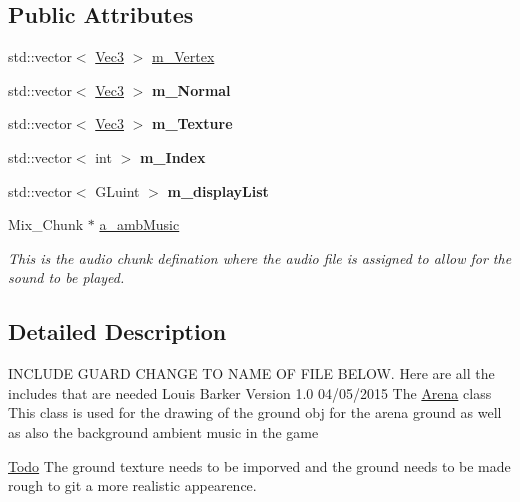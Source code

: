 \subsection*{Public Attributes}
\begin{DoxyCompactItemize}
\item 
std::vector$<$ \hyperlink{classVec3}{Vec3} $>$ \hyperlink{classArena_ac59e6d56bc44072d9d7dba67e564f391}{m\_\-Vertex}
\item 
\hypertarget{classArena_a3e8110033d9a5dfbe494f805600d7791}{
std::vector$<$ \hyperlink{classVec3}{Vec3} $>$ {\bfseries m\_\-Normal}}
\label{classArena_a3e8110033d9a5dfbe494f805600d7791}

\item 
\hypertarget{classArena_a5e3195849d8d9736489971685b6cb679}{
std::vector$<$ \hyperlink{classVec3}{Vec3} $>$ {\bfseries m\_\-Texture}}
\label{classArena_a5e3195849d8d9736489971685b6cb679}

\item 
\hypertarget{classArena_a3198a681ee8b1b01e40fee66f6042b20}{
std::vector$<$ int $>$ {\bfseries m\_\-Index}}
\label{classArena_a3198a681ee8b1b01e40fee66f6042b20}

\item 
\hypertarget{classArena_a930938ac5f4e5c615c740fa529d6c356}{
std::vector$<$ GLuint $>$ {\bfseries m\_\-displayList}}
\label{classArena_a930938ac5f4e5c615c740fa529d6c356}

\item 
\hypertarget{classArena_a5ada0c01bac277be035b19d317927708}{
Mix\_\-Chunk $\ast$ \hyperlink{classArena_a5ada0c01bac277be035b19d317927708}{a\_\-ambMusic}}
\label{classArena_a5ada0c01bac277be035b19d317927708}

\begin{DoxyCompactList}\small\item\em This is the audio chunk defination where the audio file is assigned to allow for the sound to be played. \item\end{DoxyCompactList}\end{DoxyCompactItemize}


\subsection{Detailed Description}
INCLUDE GUARD CHANGE TO NAME OF FILE BELOW. Here are all the includes that are needed Louis Barker Version 1.0 04/05/2015 The \hyperlink{classArena}{Arena} class This class is used for the drawing of the ground obj for the arena ground as well as also the background ambient music in the game \begin{Desc}
\item[\hyperlink{todo__todo000001}{Todo}]The ground texture needs to be imporved and the ground needs to be made rough to git a more realistic appearence. \end{Desc}


